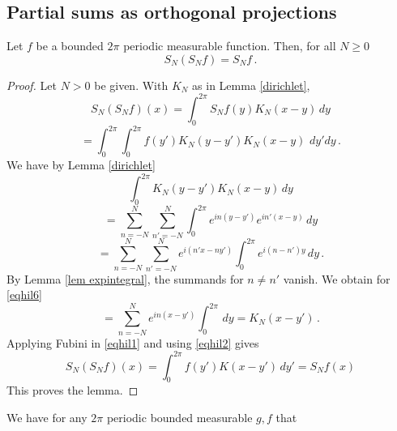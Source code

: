 {\subsection{Partial sums as orthogonal projections}
\label{10projection}








\begin{lemma}\label{lem projection}
  Let $f$ be a bounded $2\pi$ periodic measurable function. Then, for all $N\ge 0$
   \begin{equation}\label{projection}
   S_N(S_N f)=S_Nf\, .
   \end{equation}
   \end{lemma}
\begin{proof}
Let $N>0$ be given. With $K_N$ as in Lemma \ref{dirichlet},
\begin{equation*}
S_N (S_Nf) (x)=
\int_0^{2\pi} S_Nf(y)K_N(x-y)\, dy
\end{equation*}
\begin{equation}\label{eqhil1}
=
\int_0^{2\pi} \int_0^{2\pi} f(y')K_N(y-y') K_N(x-y)\, \, dy' dy\, .
\end{equation}
We have by Lemma \ref{dirichlet}
\begin{equation*}
\int_0^{2\pi} K_N(y-y') K_N(x-y)\,  dy
\end{equation*}
\begin{equation*}
=\sum_{n=-N}^N\sum_{n'=-N}^N
\int_0^{2\pi} e^{in(y-y')}e^{in'(x-y)}\,  dy
\end{equation*}
\begin{equation}\label{eqhil6}
=\sum_{n=-N}^N\sum_{n'=-N}^N
e^{i(n'x-ny')}\int_0^{2\pi} e^{i(n-n')y}\,  dy\, .
\end{equation}
By Lemma \ref{lem expintegral}, the summands for $n\neq n'$ vanish.
We obtain for \eqref{eqhil6}
\begin{equation}\label{eqhil2}
=\sum_{n=-N}^N
e^{in(x-y')}\int_0^{2\pi} \,  dy=K_N(x-y')\, .
\end{equation}
Applying Fubini in  \eqref{eqhil1} and using
\eqref{eqhil2} gives
\begin{equation}
S_N(S_Nf)(x)=
\int_0^{2\pi}  f(y')K(x-y')  \, dy'=S_N f(x)
\end{equation}
This proves the lemma.
\end{proof}
\begin{lemma}\label{selfadjoint}
    We have for any $2\pi$ periodic bounded measurable $g,f$ that
    \begin{equation}

\end{equation}
\end{lemma}}
